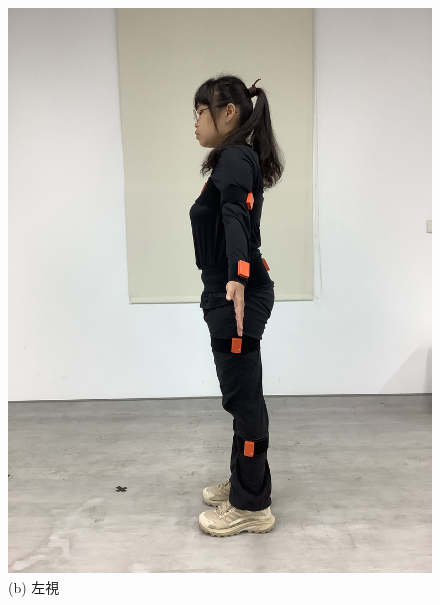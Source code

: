 \begin{figure}[!ht]
\begin{minipage}{.25\textwidth}
      \includegraphics[width=\linewidth, angle=-90]{figure/ch3_fig_leftimu.JPG}
      \caption*{(b) 左視}
   \end{minipage}%
   \begin{minipage}{.25\textwidth}
      \centering

\end{minipage}
\end{figure}
